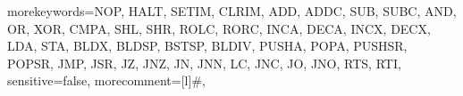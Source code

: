 \newcommand\MESourceFileWithResult[5][]{
	\setkeys{MEMacros}{wide=false,language={[ANSI]C},options={}, decorations={},#1}%
	\begingroup%
	\begingroup\edef\x{\endgroup\noexpand\MESetListingFormat[\ME@options]{\ME@language}}\x
	\if@twocolumn%
	\setlength\mywidth{\columnwidth}
	\else%
	\setlength\mywidth{.46\textwidth}
	\ifx\eBook\undefined \lstset{basicstyle=\tiny} \fi
	\fi
	
	\ifx\MayFloat\undefined
	{\par\vskip-\parskip
	\color{HeadingColor}\bfseries\scriptsize #4}
	\else
	{
		\begin{program*}[h!btp]	%
		}
		\vglue-1.7\baselineskip
		\fi\mbox{}\phantomsection
		\vskip-.6\baselineskip\noindent
		\begin{tabular}{p{.48\mywidth}p{.48\mywidth}}
		\noindent\begingroup\protected@edef\x{\endgroup\noexpand
			}
		\x
		\ME@decorations %
			&
			\lstset{language={bash},backgroundcolor=\color{gray!20}}			\ifx\MayFloat\undefined
	
				 {#3}\\			\else 	
			
				 {#3}\\\fi
		\end{tabular}
		\par\vskip-.6\baselineskip
		\ifx\MayFloat\undefined	%
		\else
		{	
		\end{program*}}
		\fi
		\endgroup%
	}
\makeatother

{morekeywords={NOP, HALT, SETIM, CLRIM, ADD, ADDC, SUB, SUBC, AND, OR, XOR, CMPA,
							SHL, SHR, ROLC, RORC, INCA, DECA, INCX, DECX, LDA, STA,
							BLDX, BLDSP, BSTSP, BLDIV, PUSHA, POPA, PUSHSR, POPSR, JMP, JSR,
							JZ, JNZ, JN, JNN, LC, JNC, JO, JNO, RTS, RTI},
sensitive=false,
morecomment=[l]{\#},
}

